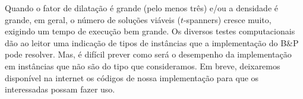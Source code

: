 



Quando o fator de dilatação é grande (pelo menos três) e/ou a
densidade é grande, em geral, o número de soluções viáveis
($t$-spanners) cresce muito, exigindo um tempo de execução bem
grande. Os diversos testes computacionais dão ao leitor uma indicação de
tipos de
instâncias que a implementação do B\&P pode resolver. Mas, é difícil
prever como será o desempenho da implementação em instâncias que não
são do tipo que consideramos. Em breve, deixaremos disponível na
internet os códigos de nossa implementação para que os interessadas
possam fazer uso. 
